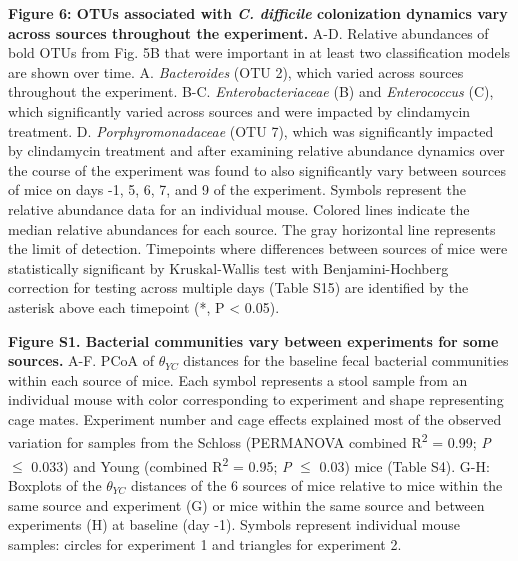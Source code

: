 \documentclass[
  11pt,
]{article}
\begin{document}
\newpage

\textbf{Figure 6: OTUs associated with \emph{C. difficile} colonization
dynamics vary across sources throughout the experiment.} A-D. Relative
abundances of bold OTUs from Fig. 5B that were important in at least two
classification models are shown over time. A. \emph{Bacteroides} (OTU
2), which varied across sources throughout the experiment. B-C.
\emph{Enterobacteriaceae} (B) and \emph{Enterococcus} (C), which
significantly varied across sources and were impacted by clindamycin
treatment. D. \emph{Porphyromonadaceae} (OTU 7), which was significantly
impacted by clindamycin treatment and after examining relative abundance
dynamics over the course of the experiment was found to also
significantly vary between sources of mice on days -1, 5, 6, 7, and 9 of
the experiment. Symbols represent the relative abundance data for an
individual mouse. Colored lines indicate the median relative abundances
for each source. The gray horizontal line represents the limit of
detection. Timepoints where differences between sources of mice were
statistically significant by Kruskal-Wallis test with Benjamini-Hochberg
correction for testing across multiple days (Table S15) are identified
by the asterisk above each timepoint (*, P \textless{} 0.05).

\newpage

\textbf{Figure S1. Bacterial communities vary between experiments for
some sources.} A-F. PCoA of \(\theta_{YC}\) distances for the baseline
fecal bacterial communities within each source of mice. Each symbol
represents a stool sample from an individual mouse with color
corresponding to experiment and shape representing cage mates.
Experiment number and cage effects explained most of the observed
variation for samples from the Schloss (PERMANOVA combined
R\textsuperscript{2} = 0.99; \emph{P} \(\le\) 0.033) and Young (combined
R\textsuperscript{2} = 0.95; \emph{P} \(\le\) 0.03) mice (Table S4).
G-H: Boxplots of the \(\theta_{YC}\) distances of the 6 sources of mice
relative to mice within the same source and experiment (G) or mice
within the same source and between experiments (H) at baseline (day -1).
Symbols represent individual mouse samples: circles for experiment 1 and
triangles for experiment 2.

\newpage
\end{document}
